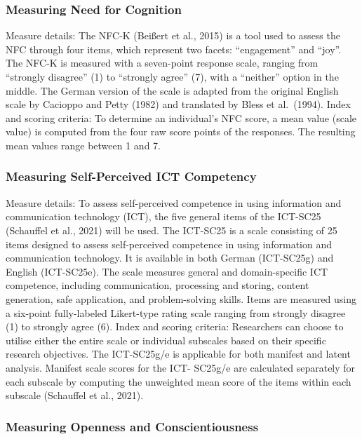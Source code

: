 \documentclass[
  12pt,
  a4paper,
  twoside]{article}
\begin{document}
\subsubsection{Measuring Need for Cognition}\label{measuring-need-for-cognition}

Measure details: The NFC-K (Beißert et al., 2015) is a tool used to assess the
NFC through four items, which represent two facets: ``engagement'' and ``joy''. The
NFC-K is measured with a seven-point response scale, ranging from ``strongly
disagree'' (1) to ``strongly agree'' (7), with a ``neither'' option in the middle. The
German version of the scale is adapted from the original English scale by Cacioppo
and Petty (1982) and translated by Bless et al.~(1994).
Index and scoring criteria: To determine an individual's NFC score, a mean value
(scale value) is computed from the four raw score points of the responses. The
resulting mean values range between 1 and 7.

\subsubsection{Measuring Self-Perceived ICT Competency}\label{measuring-self-perceived-ict-competency}

Measure details: To assess self-perceived competence in using information and
communication technology (ICT), the five general items of the ICT-SC25 (Schauffel
et al., 2021) will be used. The ICT-SC25 is a scale consisting of 25 items designed to
assess self-perceived competence in using information and communication
technology. It is available in both German (ICT-SC25g) and English (ICT-SC25e). The
scale measures general and domain-specific ICT competence, including
communication, processing and storing, content generation, safe application, and
problem-solving skills. Items are measured using a six-point fully-labeled Likert-type
rating scale ranging from strongly disagree (1) to strongly agree (6).
Index and scoring criteria: Researchers can choose to utilise either the entire scale
or individual subscales based on their specific research objectives. The ICT-SC25g/e
is applicable for both manifest and latent analysis. Manifest scale scores for the ICT-
SC25g/e are calculated separately for each subscale by computing the unweighted
mean score of the items within each subscale (Schauffel et al., 2021).

\subsubsection{Measuring Openness and Conscientiousness}\label{measuring-openness-and-conscientiousness}
\end{document}
